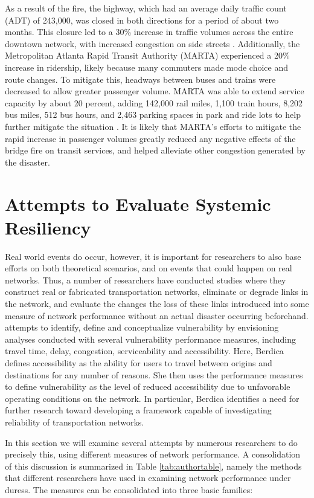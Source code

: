As a result of the fire, the highway, which had an average daily traffic
count (ADT) of 243,000,
was closed in both directions for a period of about two months. This
closure led to a 30\%
increase in traffic volumes across the entire downtown network, with
increased congestion on side
streets \citep{hamedi2018}. Additionally, the Metropolitan Atlanta Rapid
Transit Authority
(MARTA) experienced a 20\% increase in ridership, likely because many
commuters made mode choice
and route changes. To mitigate this, headways between buses and trains
were decreased to allow
greater passenger volume. MARTA was able to extend service capacity by about 20 percent, adding 142,000 rail miles, 1,100
train hours, 8,202 bus
miles, 512 bus hours, and 2,463 parking spaces in park and ride lots to
help further mitigate the
situation \citep{marta2017, marta2018}. It is likely that MARTA’s efforts
to mitigate the rapid increase in passenger
volumes greatly reduced any negative effects of the bridge
fire on transit services, and helped alleviate other congestion generated by the disaster.

\section{Attempts to Evaluate Systemic Resiliency}

Real world events do occur, however, it is important for researchers to also
base efforts on both theoretical scenarios, and on events that could happen on
real networks. Thus, a number of researchers have conducted studies where they
construct real
or fabricated
transportation networks, eliminate or degrade links in the network, and
evaluate the changes the
loss of these links introduced into some measure of network performance without
an actual disaster occurring beforehand.
\citet{berdica2002}
attempts
to identify, define and conceptualize vulnerability by envisioning
analyses conducted with
several vulnerability performance measures, including travel time, delay,
congestion,
serviceability and accessibility. Here, Berdica defines accessibility as
the ability for users to
travel between origins and destinations for any number of reasons. She
then uses the performance
measures to define vulnerability as the level of reduced accessibility due
to unfavorable
operating conditions on the network. In particular, Berdica identifies a
need for further
research toward developing a framework capable of investigating
reliability of transportation
networks.

In this section we will examine several attempts by numerous researchers
to do precisely this,
using different measures of network performance. A consolidation of this
discussion is summarized
in Table \ref{tab:authortable}, namely the methods that different researchers have
used in examining network
performance under duress. The measures can be consolidated into three
basic families:

